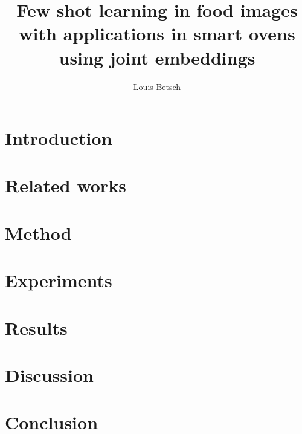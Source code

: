 \documentclass[12pt]{article}
\title{Few shot learning in food images with applications in smart ovens using joint embeddings}
\author{Louis Betsch}
\begin{document}
\maketitle


\clearpage

\tableofcontents
\clearpage

\printnoidxglossary[type=\acronymtype]
\clearpage

\section{Introduction}
\label{sec:introduction}


\section{Related works}
\label{sec:related_works}


\section{Method}
\label{sec:method}


\section{Experiments}
\label{sec:experiments}


\section{Results}
\label{sec:results}


\section{Discussion}
\label{sec:discussion}


\section{Conclusion}
\label{sec:conclusion}



\clearpage

\printbibliography
\end{document}
